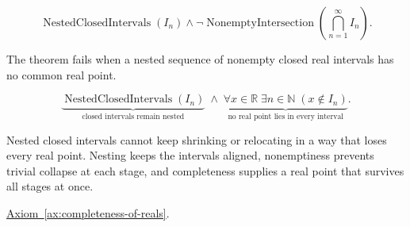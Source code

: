\begin{remark*}
\[
\operatorname{NestedClosedIntervals}(I_n)
\land
\neg\operatorname{NonemptyIntersection}\!\left(\bigcap_{n=1}^{\infty}I_n\right).
\]
\end{remark*}

\begin{remark*}
The theorem fails when a nested sequence of nonempty closed real intervals has no common real point.
\end{remark*}

\begin{remark*}
\[
\underbrace{\operatorname{NestedClosedIntervals}(I_n)}_{\text{closed intervals remain nested}}
\;\land\;
\underbrace{\forall x\in\mathbb{R}\;\exists n\in\mathbb{N}\;(x\notin I_n)}_{\text{no real point lies in every interval}}.
\]
\end{remark*}

\begin{remark*}[Interpretation]
Nested closed intervals cannot keep shrinking or relocating in a way that loses every real point. Nesting keeps the intervals aligned, nonemptiness prevents trivial collapse at each stage, and completeness supplies a real point that survives all stages at once.
\end{remark*}

\begin{dependencies}
\hyperref[ax:completeness-of-reals]{Axiom~\ref*{ax:completeness-of-reals}}.
\end{dependencies}



